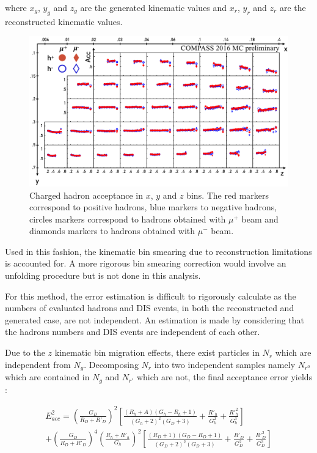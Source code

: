 \documentclass[letterpaper,12pt]{article}
\begin{document}
where $x_g$, $y_g$ and $z_g$ are the generated kinematic values and $x_r$, $y_r$ and $z_r$ are the reconstructed kinematic
values.

\begin{figure}
	\includegraphics[scale=0.5]{./gfx/AccH.png}
	\caption{Charged hadron acceptance in $x$, $y$ and $z$ bins. The red markers correspond to positive hadrons, blue markers to negative hadrons, circles markers correspond to hadrons obtained with $\mu^+$ beam and diamonds markers to hadrons obtained with $\mu^-$ beam.}
	\label{AccH}
\end{figure}

Used in this fashion, the kinematic bin smearing due to reconstruction limitations is accounted for. A more rigorous
bin smearing correction would involve an unfolding procedure but is not done in this analysis.

For this method, the error estimation is difficult to rigorously calculate as the numbers of evaluated hadrons and DIS events,
in both the reconstructed and generated case, are not independent. An estimation is made by considering that the hadrons numbers
and DIS events are independent of each other.

Due to the $z$ kinematic bin migration effects, there exist particles in $N_r$ which are independent from $N_g$. Decomposing $N_r$
into two independent samples namely $N_{r^0}$ which are contained in $N_g$ and $N_{r'}$ which are not, the final acceptance error yields :

\begin{equation}
  \begin{split}
    E^2_{acc} = \left (\frac{G_D}{R_D+R'_{D}}\right )^2\left [\frac{(R_h+A)(G_h-R_h+1)}{(G_h+2)^2(G_D+3)}+\frac{R'_{h}}{G^2_h}+\frac{R'^2_h}{G^3_h}\right ] \\
                + \left (\frac{G_D}{R_D+R'_{D}}\right )^4\left (\frac{R_h+R'_h}{G_h}\right )^2\left [\frac{(R_D+1)(G_D-R_D+1)}{(G_D+2)^2(G_D+3)}+\frac{R'_D}{G^2_D}+\frac{R'^2_D}{G^3_D}\right ]
  \end{split}
\end{equation}
\end{document}
